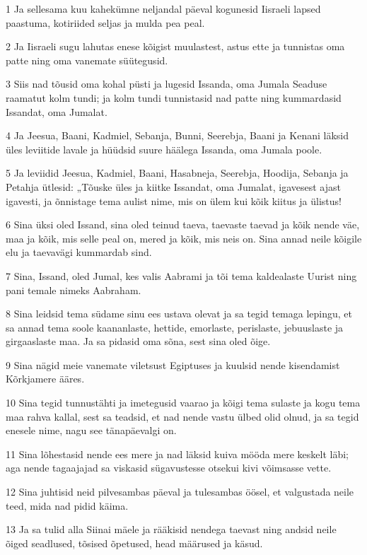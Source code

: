 \par 1 Ja sellesama kuu kahekümne neljandal päeval kogunesid Iisraeli lapsed paastuma, kotiriided seljas ja mulda pea peal.
\par 2 Ja Iisraeli sugu lahutas enese kõigist muulastest, astus ette ja tunnistas oma patte ning oma vanemate süütegusid.
\par 3 Siis nad tõusid oma kohal püsti ja lugesid Issanda, oma Jumala Seaduse raamatut kolm tundi; ja kolm tundi tunnistasid nad patte ning kummardasid Issandat, oma Jumalat.
\par 4 Ja Jeesua, Baani, Kadmiel, Sebanja, Bunni, Seerebja, Baani ja Kenani läksid üles leviitide lavale ja hüüdsid suure häälega Issanda, oma Jumala poole.
\par 5 Ja leviidid Jeesua, Kadmiel, Baani, Hasabneja, Seerebja, Hoodija, Sebanja ja Petahja ütlesid: „Tõuske üles ja kiitke Issandat, oma Jumalat, igavesest ajast igavesti, ja õnnistage tema aulist nime, mis on ülem kui kõik kiitus ja ülistus!
\par 6 Sina üksi oled Issand, sina oled teinud taeva, taevaste taevad ja kõik nende väe, maa ja kõik, mis selle peal on, mered ja kõik, mis neis on. Sina annad neile kõigile elu ja taevavägi kummardab sind.
\par 7 Sina, Issand, oled Jumal, kes valis Aabrami ja tõi tema kaldealaste Uurist ning pani temale nimeks Aabraham.
\par 8 Sina leidsid tema südame sinu ees ustava olevat ja sa tegid temaga lepingu, et sa annad tema soole kaananlaste, hettide, emorlaste, perislaste, jebuuslaste ja girgaaslaste maa. Ja sa pidasid oma sõna, sest sina oled õige.
\par 9 Sina nägid meie vanemate viletsust Egiptuses ja kuulsid nende kisendamist Kõrkjamere ääres.
\par 10 Sina tegid tunnustähti ja imetegusid vaarao ja kõigi tema sulaste ja kogu tema maa rahva kallal, sest sa teadsid, et nad nende vastu ülbed olid olnud, ja sa tegid enesele nime, nagu see tänapäevalgi on.
\par 11 Sina lõhestasid nende ees mere ja nad läksid kuiva mööda mere keskelt läbi; aga nende tagaajajad sa viskasid sügavustesse otsekui kivi võimsasse vette.
\par 12 Sina juhtisid neid pilvesambas päeval ja tulesambas öösel, et valgustada neile teed, mida nad pidid käima.
\par 13 Ja sa tulid alla Siinai mäele ja rääkisid nendega taevast ning andsid neile õiged seadlused, tõsised õpetused, head määrused ja käsud.

